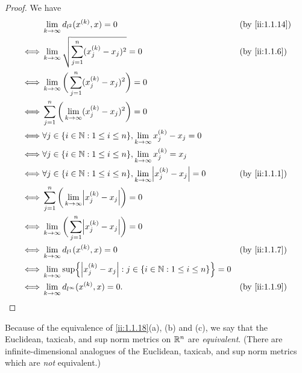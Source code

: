 \begin{proof}
  We have
  \begin{align*}
         & \lim_{k \to \infty} d_{l^2}(x^{(k)}, x) = 0                                                      &  & \by{ii:1.1.14} \\
    \iff & \lim_{k \to \infty} \sqrt{\sum_{j = 1}^n (x_j^{(k)} - x_j)^2} = 0                                &  & \by{ii:1.1.6}  \\
    \iff & \lim_{k \to \infty} \bigg(\sum_{j = 1}^n (x_j^{(k)} - x_j)^2\bigg) = 0                                               \\
    \iff & \sum_{j = 1}^n \bigg(\lim_{k \to \infty} (x_j^{(k)} - x_j)^2\bigg) = 0                                               \\
    \iff & \forall j \in \set{i \in \N : 1 \leq i \leq n}, \lim_{k \to \infty} x_j^{(k)} - x_j = 0                              \\
    \iff & \forall j \in \set{i \in \N : 1 \leq i \leq n}, \lim_{k \to \infty} x_j^{(k)} = x_j                                  \\
    \iff & \forall j \in \set{i \in \N : 1 \leq i \leq n}, \lim_{k \to \infty} \abs{x_j^{(k)} - x_j} = 0    &  & \by{ii:1.1.1}  \\
    \iff & \sum_{j = 1}^n \bigg(\lim_{k \to \infty} \abs{x_j^{(k)} - x_j}\bigg) = 0                                             \\
    \iff & \lim_{k \to \infty} \bigg(\sum_{j = 1}^n \abs{x_j^{(k)} - x_j}\bigg) = 0                                             \\
    \iff & \lim_{k \to \infty} d_{l^1}(x^{(k)}, x) = 0                                                      &  & \by{ii:1.1.7}  \\
    \iff & \lim_{k \to \infty} \sup\set{\abs{x_j^{(k)} - x_j} : j \in \set{i \in \N : 1 \leq i \leq n}} = 0                     \\
    \iff & \lim_{k \to \infty} d_{l^\infty}(x^{(k)}, x) = 0.                                                &  & \by{ii:1.1.9}
  \end{align*}
\end{proof}

\begin{note}
  Because of the equivalence of \cref{ii:1.1.18}(a), (b) and (c), we say that the Euclidean, taxicab, and sup norm metrics on \(\mathbb{R}^n\) are \emph{equivalent}.
  (There are infinite-dimensional analogues of the Euclidean, taxicab, and sup norm metrics which are \emph{not} equivalent.)
\end{note}

